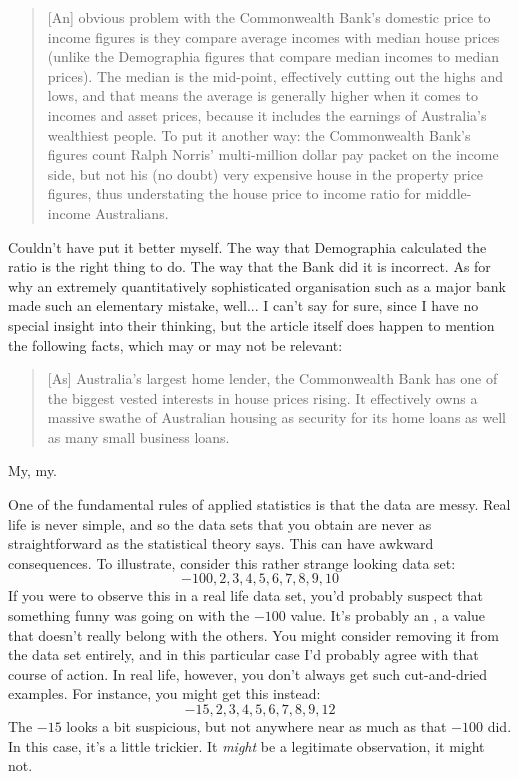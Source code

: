 \begin{quote}
[An] obvious problem with the Commonwealth Bank's domestic price to income figures is they compare average incomes with median house prices (unlike the Demographia figures that compare median incomes to median prices). The median is the mid-point, effectively cutting out the highs and lows, and that means the average is generally higher when it comes to incomes and asset prices, because it includes the earnings of Australia's wealthiest people. To put it another way: the Commonwealth Bank's figures count Ralph Norris' multi-million dollar pay packet on the income side, but not his (no doubt) very expensive house in the property price figures, thus understating the house price to income ratio for middle-income Australians.
\end{quote}
Couldn't have put it better myself. The way that Demographia calculated the ratio is the right thing to do. The way that the Bank did it is incorrect. As for why an extremely quantitatively sophisticated organisation such as a major bank made such an elementary mistake, well... I can't say for sure, since I have no special insight into their thinking, but the article itself does happen to mention the following facts, which may or may not be relevant:
\begin{quote}
[As] Australia's largest home lender, the Commonwealth Bank has one of the biggest vested interests in house prices rising. It effectively owns a massive swathe of Australian housing as security for its home loans as well as many small business loans.
\end{quote}
My, my. 






One of the fundamental rules of applied statistics is that the data are messy. Real life is never simple, and so the data sets that you obtain are never as straightforward as the statistical theory says. This can have awkward consequences. To illustrate, consider this rather strange looking data set:
$$
-100,2,3,4,5,6,7,8,9,10
$$
If you were to observe this in a real life data set, you'd probably suspect that something funny was going on with the $-100$ value. It's probably an , a value that doesn't really belong with the others. You might consider removing it from the data set entirely, and in this particular case I'd probably agree with that course of action. In real life, however, you don't always get such cut-and-dried examples. For instance, you might get this instead:
$$
-15,2,3,4,5,6,7,8,9,12
$$
The $-15$ looks a bit suspicious, but not anywhere near as much as that $-100$ did. In this case, it's a little trickier. It {\it might} be a legitimate observation, it might not.

